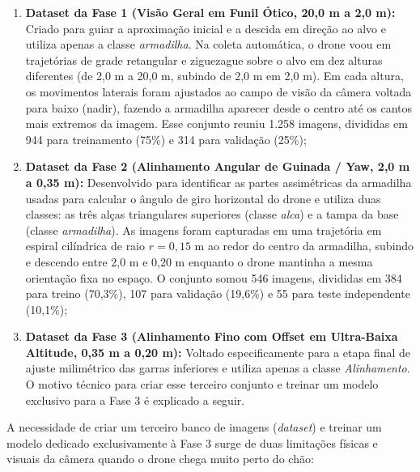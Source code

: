 \begin{enumerate}
	\item \textbf{Dataset da Fase 1 (Visão Geral em Funil Ótico, 20,0 m a 2,0 m):} Criado para guiar a aproximação inicial e a descida em direção ao alvo e utiliza apenas a classe \textit{armadilha}. Na coleta automática, o drone voou em trajetórias de grade retangular e ziguezague sobre o alvo em dez alturas diferentes (de 2,0 m a 20,0 m, subindo de 2,0 m em 2,0 m). Em cada altura, os movimentos laterais foram ajustados ao campo de visão da câmera voltada para baixo (nadir), fazendo a armadilha aparecer desde o centro até os cantos mais extremos da imagem. Esse conjunto reuniu 1.258 imagens, divididas em 944 para treinamento (75\%) e 314 para validação (25\%);
	
	\item \textbf{Dataset da Fase 2 (Alinhamento Angular de Guinada / Yaw, 2,0 m a 0,35 m):} Desenvolvido para identificar as partes assimétricas da armadilha usadas para calcular o ângulo de giro horizontal do drone e utiliza duas classes: as três alças triangulares superiores (classe \textit{alca}) e a tampa da base (classe \textit{armadilha}). As imagens foram capturadas em uma trajetória em espiral cilíndrica de raio $r = 0,15\text{ m}$ ao redor do centro da armadilha, subindo e descendo entre 2,0 m e 0,20 m enquanto o drone mantinha a mesma orientação fixa no espaço. O conjunto somou 546 imagens, divididas em 384 para treino (70,3\%), 107 para validação (19,6\%) e 55 para teste independente (10,1\%);
	
	\item \textbf{Dataset da Fase 3 (Alinhamento Fino com Offset em Ultra-Baixa Altitude, 0,35 m a 0,20 m):} Voltado especificamente para a etapa final de ajuste milimétrico das garras inferiores e utiliza apenas a classe \textit{Alinhamento}. O motivo técnico para criar esse terceiro conjunto e treinar um modelo exclusivo para a Fase 3 é explicado a seguir.
\end{enumerate}


A necessidade de criar um terceiro banco de imagens (\textit{dataset}) e treinar um modelo dedicado exclusivamente à Fase 3 surge de duas limitações físicas e visuais da câmera quando o drone chega muito perto do chão:

